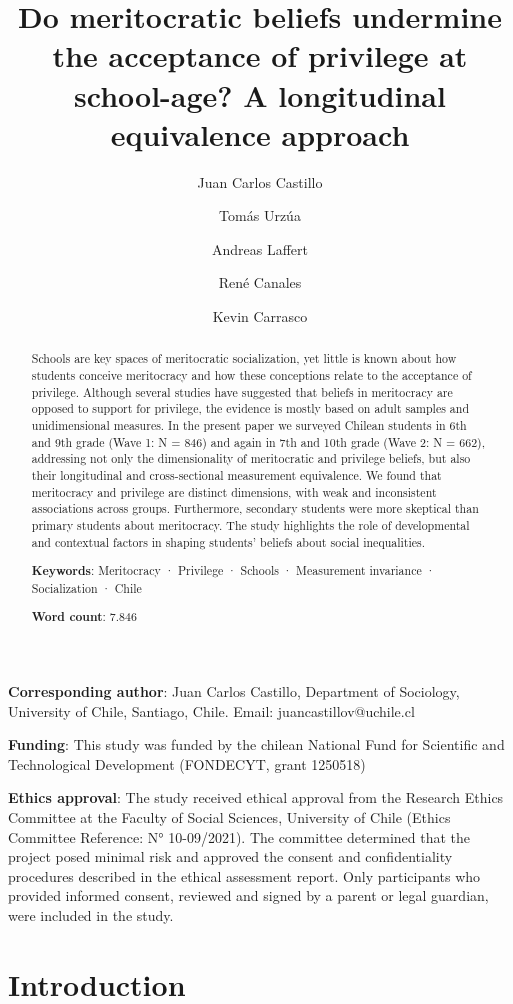 \documentclass[
  11pt,
]{article}
\title{Do meritocratic beliefs undermine the acceptance of privilege at
school-age? A longitudinal equivalence approach}
\author[1]{Juan Carlos Castillo}
\author[1]{Tomás Urzúa}
\author[2]{Andreas Laffert}
\author[3]{René Canales}
\author[1]{Kevin Carrasco}
\affil[1]{Department of Sociology, University of Chile}
\affil[2]{Cluster of Excellence The Politics of Inequality,University
of Konstanz, Germany}
\affil[3]{Bremen International Graduate School of Social Sciences
(BIGSSS), University of Bremen, Germany}
\date{}
\begin{document}
\maketitle
\begin{abstract}
Schools are key spaces of meritocratic socialization, yet little is
known about how students conceive meritocracy and how these conceptions
relate to the acceptance of privilege. Although several studies have
suggested that beliefs in meritocracy are opposed to support for
privilege, the evidence is mostly based on adult samples and
unidimensional measures. In the present paper we surveyed Chilean
students in 6th and 9th grade (Wave 1: N = 846) and again in 7th and
10th grade (Wave 2: N = 662), addressing not only the dimensionality of
meritocratic and privilege beliefs, but also their longitudinal and
cross-sectional measurement equivalence. We found that meritocracy and
privilege are distinct dimensions, with weak and inconsistent
associations across groups. Furthermore, secondary students were more
skeptical than primary students about meritocracy. The study highlights
the role of developmental and contextual factors in shaping students'
beliefs about social inequalities.

\medskip

\textbf{Keywords}: Meritocracy · Privilege · Schools · Measurement
invariance · Socialization · Chile

\medskip

\textbf{Word count}: 7.846
\end{abstract}


\textbf{Corresponding author}: Juan Carlos Castillo, Department of
Sociology, University of Chile, Santiago, Chile. Email:
juancastillov@uchile.cl

\textbf{Funding}: This study was funded by the chilean National Fund for
Scientific and Technological Development (FONDECYT, grant 1250518)

\textbf{Ethics approval}: The study received ethical approval from the
Research Ethics Committee at the Faculty of Social Sciences, University
of Chile (Ethics Committee Reference: N° 10-09/2021). The committee
determined that the project posed minimal risk and approved the consent
and confidentiality procedures described in the ethical assessment
report. Only participants who provided informed consent, reviewed and
signed by a parent or legal guardian, were included in the study.

\section{Introduction}\label{introduction}
\end{document}
